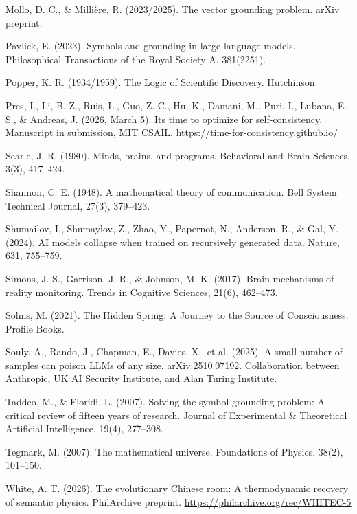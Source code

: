 \documentclass[
]{article}
\begin{document}
Mollo, D. C., \& Millière, R. (2023/2025). The vector grounding problem.
arXiv preprint.

Pavlick, E. (2023). Symbols and grounding in large language models.
Philosophical Transactions of the Royal Society A, 381(2251).

Popper, K. R. (1934/1959). The Logic of Scientific Discovery.
Hutchinson.

Pres, I., Li, B. Z., Ruis, L., Guo, Z. C., Hu, K., Damani, M., Puri, I.,
Lubana, E. S., \& Andreas, J. (2026, March 5). It\textquotesingle s time
to optimize for self-consistency. Manuscript in submission, MIT CSAIL.
https://time-for-consistency.github.io/

Searle, J. R. (1980). Minds, brains, and programs. Behavioral and Brain
Sciences, 3(3), 417--424.

Shannon, C. E. (1948). A mathematical theory of communication. Bell
System Technical Journal, 27(3), 379--423.

Shumailov, I., Shumaylov, Z., Zhao, Y., Papernot, N., Anderson, R., \&
Gal, Y. (2024). AI models collapse when trained on recursively generated
data. Nature, 631, 755--759.

Simons, J. S., Garrison, J. R., \& Johnson, M. K. (2017). Brain
mechanisms of reality monitoring. Trends in Cognitive Sciences, 21(6),
462--473.

Solms, M. (2021). The Hidden Spring: A Journey to the Source of
Consciousness. Profile Books.

Souly, A., Rando, J., Chapman, E., Davies, X., et al. (2025). A small
number of samples can poison LLMs of any size. arXiv:2510.07192.
Collaboration between Anthropic, UK AI Security Institute, and Alan
Turing Institute.

Taddeo, M., \& Floridi, L. (2007). Solving the symbol grounding problem:
A critical review of fifteen years of research. Journal of Experimental
\& Theoretical Artificial Intelligence, 19(4), 277--308.

Tegmark, M. (2007). The mathematical universe. Foundations of Physics,
38(2), 101--150.

White, A. T. (2026). The evolutionary Chinese room: A thermodynamic
recovery of semantic physics. PhilArchive preprint.
\href{https://philarchive.org/rec/WHITEC-5}{\ul{https://philarchive.org/rec/WHITEC-5}}
\end{document}

